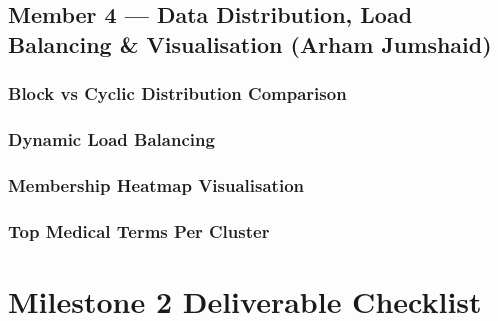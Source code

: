 \documentclass[12pt,a4paper]{article}
\begin{document}
\vspace{2em}
\subsection*{Member 4 --- Data Distribution, Load Balancing \& Visualisation (Arham Jumshaid)}
\subsubsection*{Block vs Cyclic Distribution Comparison}
\subsubsection*{Dynamic Load Balancing}
\subsubsection*{Membership Heatmap Visualisation}
\subsubsection*{Top Medical Terms Per Cluster}

\section{Milestone 2 Deliverable Checklist}
\end{document}
